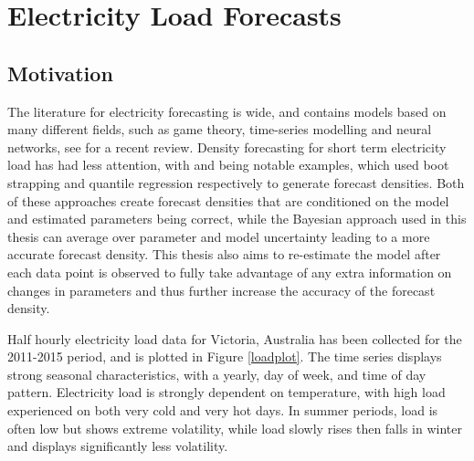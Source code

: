 \documentclass[12pt,a4paper]{article}%
\numberwithin{equation}{section}
\begin{document}
\section{Electricity Load Forecasts}
\subsection{Motivation}

The literature for electricity forecasting is wide, and contains models based on many different fields, such as game theory, time-series modelling and neural networks, see \citet{Weron2014} for a recent review. Density forecasting for short term electricity load has had less attention, with \citet{Fan2012} and \citet{He2016} 
being notable examples, which used boot strapping and quantile regression respectively to generate forecast densities. Both of these approaches create forecast densities that are conditioned on the model and estimated parameters being correct, while the Bayesian approach used in this thesis can average over parameter and model uncertainty leading to a more accurate forecast density. This thesis also aims to re-estimate the model after each data point is observed to fully take advantage of any extra information on changes in parameters and thus further increase the accuracy of the forecast density. 

Half hourly electricity load data for Victoria, Australia has been collected %
 for the 2011-2015 period, and is plotted in Figure \ref{loadplot}. The time series displays strong seasonal characteristics, with a yearly, day of week, and time of day pattern. Electricity load is strongly dependent on temperature, with high load experienced on both very cold and very hot days. In summer periods, load is often low but shows extreme volatility, while load slowly rises then falls in winter and displays significantly less volatility. 
\end{document}
